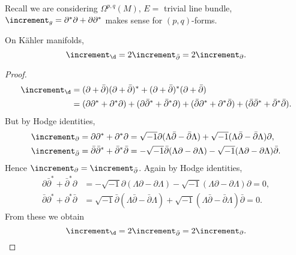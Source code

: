 \documentclass[12pt]{article}
\begin{document}
Recall we are considering \(\Omega^{p,q}(M)\), \(E=\) trivial line bundle, \(\lap_g=
\partial^*\partial +\partial\partial^*\) makes sense for \((p,q)\)-forms.
\begin{lemma}
  On K\"ahler manifolds, \[
    \lap_{\dd}=2\lap_{\bar{\partial}}=2\lap_{\partial}
  .\] 
\end{lemma}
\begin{proof}
  \begin{align*}
    \lap_{\dd{}}&=(\partial +\bar{\partial})(\partial +\bar{\partial})^*
    +(\partial +\bar{\partial})^*(\partial +\bar{\partial}) \\
    &=(\partial\partial^*+\partial^*\partial)+(\partial\bar{\partial}^*
    +\bar{\partial}^*\partial)+(\bar{\partial}\partial^*+\partial^*\bar{\partial})
    +(\bar{\partial}\bar{\partial}^*+\bar{\partial}^*\bar{\partial})
  .\end{align*}
  But by Hodge identities,
  \begin{align*}
    \lap_{\partial}&=\partial\partial^*+\partial^*\partial
    =\sqrt{-1}\partial (\Lambda\bar{\partial}-\bar{\partial}\Lambda)+
    \sqrt{-1}(\Lambda \bar{\partial}-\bar{\partial}\Lambda)\partial, \\
    \lap_{\bar{\partial}}&=\bar{\partial}\bar{\partial}^*+\bar{\partial}^*
    \bar{\partial}=-\sqrt{-1}\bar{\partial}(\Lambda\partial -\partial\Lambda)
    -\sqrt{-1}(\Lambda\partial-\partial\Lambda)\bar{\partial}
  .\end{align*}
  Hence \(\lap_{\partial}=\lap_{\bar{\partial}}\). Again by Hodge identities,
  \begin{align*}
    \partial\bar{\partial}^*+\bar{\partial}^*\partial&=-\sqrt{-1}\partial(\Lambda
    \partial-\partial\Lambda)-\sqrt{-1}(\Lambda\partial-\partial\Lambda)\partial=0,\\
    \bar{\partial}\partial^*+\partial^*\bar{\partial}&=\sqrt{-1}\bar{\partial}(\Lambda
    \bar{\partial}-\bar{\partial}\Lambda)+\sqrt{-1}(\Lambda\bar{\partial}
    -\bar{\partial}\Lambda)\bar{\partial}=0
  .\end{align*}
  From these we obtain \[
    \lap_{\dd{}}=2\lap_{\bar{\partial}}=2\lap_{\partial}
  .\] 
\end{proof}
\end{document}
